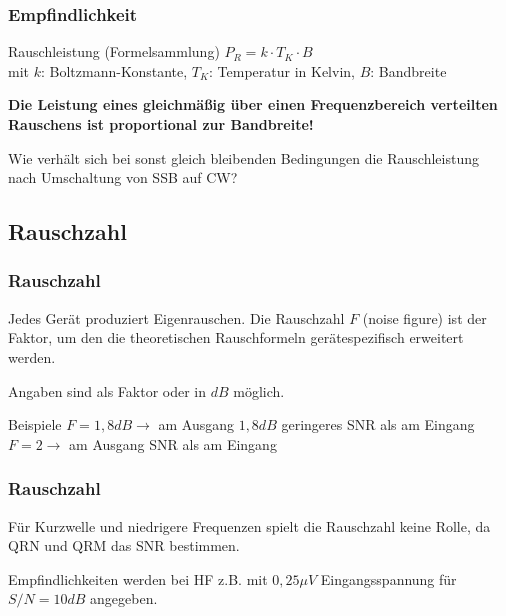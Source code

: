 \begin{frame}
  \frametitle{Empfindlichkeit}

  \begin{block}{Rauschleistung (Formelsammlung)}
    $P_R = k \cdot T_K \cdot B$\\
    mit $k$: Boltzmann-Konstante, $T_K$: Temperatur in Kelvin, $B$: Bandbreite
  \end{block}

  \bigskip

  \textbf{Die Leistung eines gleichmäßig über einen Frequenzbereich
  verteilten Rauschens ist proportional zur Bandbreite!}

  \bigskip

  \begin{exampleblock}{Wie verhält sich bei sonst gleich bleibenden Bedingungen die
    Rauschleistung nach Umschaltung von SSB auf CW?}
  \end{exampleblock}

\end{frame}

\subsection{Rauschzahl}

\begin{frame}
  \frametitle{Rauschzahl}

  Jedes Gerät produziert Eigenrauschen. Die Rauschzahl $F$ (noise figure) ist
  der Faktor, um den die theoretischen Rauschformeln gerätespezifisch
  erweitert werden.

  \bigskip

  Angaben sind als Faktor oder in $dB$ möglich.

  \bigskip

  \begin{exampleblock}{Beispiele}
    $F=1,8 dB \rightarrow$ am Ausgang $1,8dB$ geringeres SNR als am Eingang\\
    $F=2 \rightarrow$ am Ausgang   SNR als am Eingang
  \end{exampleblock}

\end{frame}

\begin{frame}
  \frametitle{Rauschzahl}

  Für Kurzwelle und niedrigere Frequenzen spielt die Rauschzahl keine Rolle,
  da QRN und QRM das SNR bestimmen.

  \bigskip

  Empfindlichkeiten werden bei HF z.B. mit $0,25 \mu V$ Eingangsspannung für
  $S/N=10 dB$ angegeben.

\end{frame}

